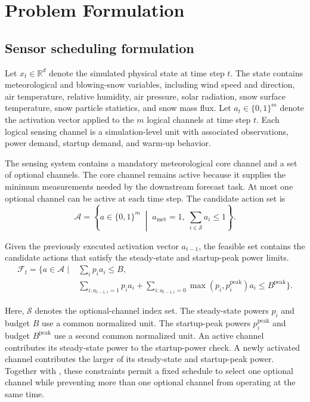 \section{Problem Formulation}

\subsection{Sensor scheduling formulation}

Let $x_t \in \mathbb{R}^d$ denote the simulated physical state at time step
$t$. The state contains meteorological and blowing-snow variables, including
wind speed and direction, air temperature, relative humidity, air pressure,
solar radiation, snow surface temperature, snow particle statistics, and snow mass flux. Let
$a_t \in \{0,1\}^m$ denote the activation vector applied to the $m$ logical
channels at time step $t$. Each logical sensing channel is a simulation-level
unit with associated observations, power demand, startup demand, and warm-up
behavior.



The sensing system contains a mandatory meteorological core channel and a set of
optional channels. The core channel remains active because it supplies the
minimum measurements needed by the downstream forecast task. At most one
optional channel can be active at each time step. The candidate action set is
\begin{equation}
  \mathcal{A}
  =
  \left\{a\in\{0,1\}^{m}\;\middle|\;
    a_{\mathrm{met}}=1,\;
    \sum_{i\in\mathcal{S}}a_i\leq1
  \right\}.
  \label{eq:candidate_action_set}
\end{equation}

Given the previously executed activation vector $a_{t-1}$, the feasible set
contains the candidate actions that satisfy the steady-state and startup-peak power
limits.
\begin{equation}
  \begin{aligned}
  \mathcal{F}_t
  =\bigg\{a\in\mathcal{A}\;\bigg|\;&
    \sum_i p_i a_i\leq B,\\[-2pt]
  & \sum_{i:a_{t-1,i}=1} p_i a_i
    +\sum_{i:a_{t-1,i}=0}
      \max\!\left(p_i,p_i^{\mathrm{peak}}\right)a_i
    \leq B^{\mathrm{peak}}
  \bigg\}.
  \label{eq:feasible_action_set}
  \end{aligned}
\end{equation}

Here, $\mathcal{S}$ denotes the optional-channel index set. The steady-state powers
$p_i$ and budget $B$ use a common normalized unit. The startup-peak powers
$p_i^{\mathrm{peak}}$ and budget $B^{\mathrm{peak}}$ use a second common
normalized unit. An active channel contributes its steady-state power to the
startup-power check. A newly activated channel contributes the larger of its
steady-state and startup-peak power. Together with , these constraints permit a fixed
schedule to select one optional channel while preventing more than one optional
channel from operating at the same time.

